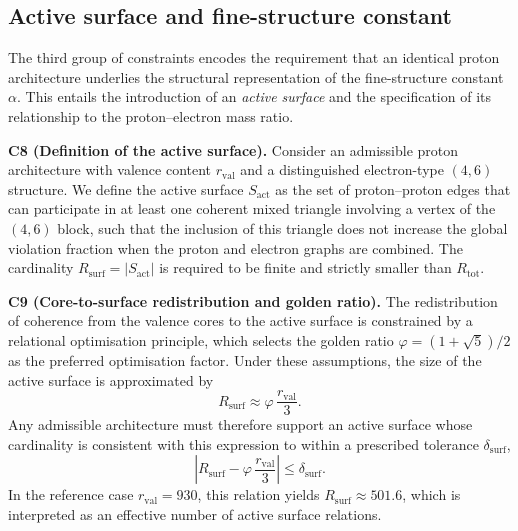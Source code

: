 \documentclass[11pt,a4paper]{article}
\begin{document}
\subsection{Active surface and fine-structure constant}

The third group of constraints encodes the requirement that an identical proton architecture underlies the structural representation of the fine-structure constant $\alpha$. This entails the introduction of an \emph{active surface} and the specification of its relationship to the proton–electron mass ratio.

\medskip
\noindent\textbf{C8 (Definition of the active surface).} Consider an admissible proton architecture with valence content $r_{\mathrm{val}}$ and a distinguished electron-type $(4,6)$ structure. We define the active surface $S_{\mathrm{act}}$ as the set of proton–proton edges that can participate in at least one coherent mixed triangle involving a vertex of the $(4,6)$ block, such that the inclusion of this triangle does not increase the global violation fraction when the proton and electron graphs are combined.\cite{LaubscherDerivationAlpha2026} The cardinality $R_{\mathrm{surf}}=|S_{\mathrm{act}}|$ is required to be finite and strictly smaller than $R_{\mathrm{tot}}$.

\medskip
\noindent\textbf{C9 (Core-to-surface redistribution and golden ratio).} The redistribution of coherence from the valence cores to the active surface is constrained by a relational optimisation principle, which selects the golden ratio $\varphi=(1+\sqrt{5})/2$ as the preferred optimisation factor.\cite{LaubscherGoldenRatioPDL2026} Under these assumptions, the size of the active surface is approximated by
\begin{equation}
R_{\mathrm{surf}} \approx \varphi\,\frac{r_{\mathrm{val}}}{3}.
\end{equation}
Any admissible architecture must therefore support an active surface whose cardinality is consistent with this expression to within a prescribed tolerance $\delta_{\mathrm{surf}}$,
\begin{equation}
\left|R_{\mathrm{surf}} - \varphi\,\frac{r_{\mathrm{val}}}{3}\right| \leq \delta_{\mathrm{surf}}.
\end{equation}
In the reference case $r_{\mathrm{val}}=930$, this relation yields $R_{\mathrm{surf}}\approx 501.6$, which is interpreted as an effective number of active surface relations.\cite{LaubscherDerivationAlpha2026}
\end{document}
